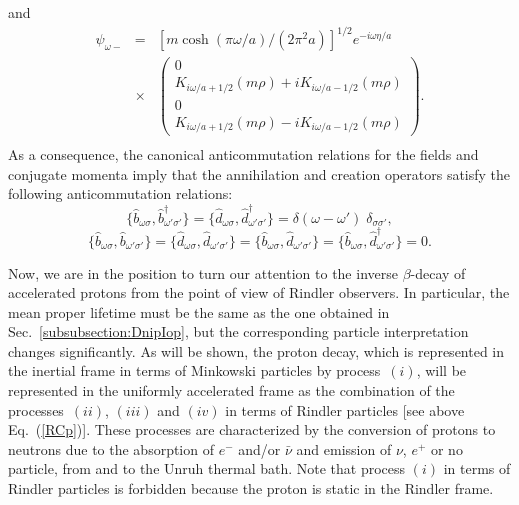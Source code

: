 \documentclass[12pt,nofootinbib,floatfix,aps,prd,showpacs,amsmath,amssymb,eqsecnum]{revtex4-2}
\begin{document}
and
\begin{eqnarray}
\psi_{\omega -}
&=&
[{m \cosh (\pi \omega/a)}/{(2 \pi^2 a)}]^{1/2}
e^{-i\omega \eta/a}
\nonumber \\
&\times & 
\left(
\begin{array}{c}
0\\
K_{i \omega/a + 1/2}(m\rho) +
i K_{i \omega/a - 1/2}(m\rho) \\
0\\
K_{i \omega/a + 1/2}(m\rho) -
i K_{i \omega/a - 1/2}(m\rho) 
\end{array}
\right).
\nonumber \\
\label{RNM2}
\end{eqnarray}
As a consequence, the 
canonical anticommutation relations for the fields and
conjugate momenta imply that the
 annihilation and creation operators satisfy
the following anticommutation relations:
\begin{equation}
\{\hat b_{\omega \sigma},\hat b^\dagger_{\omega' \sigma'}\}=
\{\hat d_{\omega \sigma},\hat d^\dagger_{\omega' \sigma'}\}=
\delta(\omega-\omega') \; \delta_{\sigma \sigma'},
\label{ACR2}
\end{equation}
\begin{equation}
\{\hat b_{\omega \sigma},\hat b_{\omega' \sigma'}\} \!\! = \!\!
\{\hat d_{\omega \sigma},\hat d_{\omega' \sigma'}\} \!\! = \!\!
\{\hat b_{\omega \sigma},\hat d_{\omega' \sigma'}\} \!\! = \!\!
\{\hat b_{\omega \sigma},\hat d^\dagger_{\omega' \sigma'}\} \!\! = \!
0.
\end{equation} 

Now, we are in the position to turn our attention to the inverse 
$\beta$-decay of accelerated protons from the point of view of 
Rindler observers. In particular, the mean proper 
lifetime must be the same as the one obtained 
in Sec.~\ref{subsubsection:DnipIop}, 
but the corresponding particle interpretation changes 
significantly. As will
be shown, the proton decay, which is represented in the inertial frame 
in terms of Minkowski particles by process~$(i)$,
will be represented in the uniformly accelerated frame
as the combination of the 
processes~$(ii)$, $(iii)$ and $(iv)$ in terms of Rindler particles 
[see above Eq.~(\ref{RCp})].
These processes are characterized by the
conversion of protons to neutrons due to the absorption 
of $ e^- $ and/or $\bar\nu$ and emission of $\nu$, $e^+$ or no particle, 
from and to the Unruh thermal bath.  
Note that process $(i)$ in terms of Rindler 
particles is forbidden because the proton is static in the Rindler frame.
\end{document}
